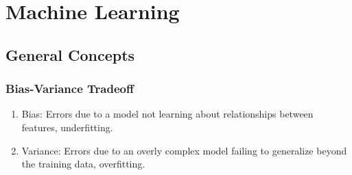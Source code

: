 \chapter{Machine Learning}
\label{ml}

\section{General Concepts}
\label{ml:general}


\subsection{Bias-Variance Tradeoff}
\label{ml:general:biasVar}

\begin{enumerate}[noitemsep]
\item Bias: Errors due to a model not learning about relationships between features, \ie underfitting.
\item Variance: Errors due to an overly complex model failing to generalize beyond the training data, \ie overfitting.
\end{enumerate}




